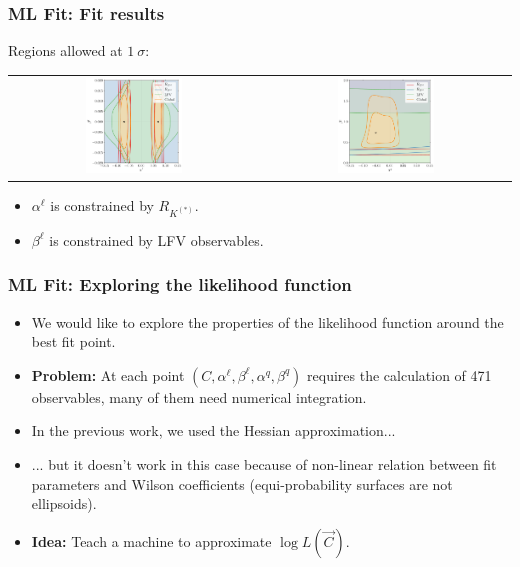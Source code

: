 \documentclass[mathserif, 10pt]{beamer}
\begin{document}
\begin{frame}\frametitle{ML Fit: Fit results}
    Regions allowed at $1~\sigma$:
    \begin{center}
        \begin{tabular}{cc}
            \includegraphics[width=0.4\textwidth]{figures/alphabeta_l.pdf} & \includegraphics[width=0.4\textwidth]{figures/alphabeta_q.pdf}
        \end{tabular}
    \end{center}
    \begin{itemize}
        \item $\alpha^\ell$ is constrained by $R_{K^{(*)}}$.
        \item $\beta^\ell$ is constrained by LFV observables.
    \end{itemize}
\end{frame}

\begin{frame}\frametitle{ML Fit: Exploring the likelihood function}

    \begin{itemize}
        \item We would like to explore the properties of the likelihood function around the best fit point.
        \item {\bf Problem:} At each point $(C, \alpha^\ell, \beta^\ell, \alpha^q, \beta^q)$ requires the calculation of 471 observables, many of them need numerical integration.
        \item In the previous work, we used the Hessian approximation...

        \item ... but it doesn't work in this case because of non-linear relation between fit parameters and Wilson coefficients (equi-probability surfaces are not ellipsoids).
        \item {\bf Idea:} Teach a machine to approximate $\log L(\vec{C})$.
    \end{itemize}

\end{frame}
\end{document}
